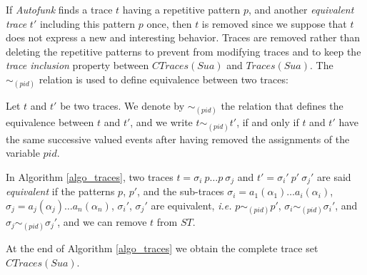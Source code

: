 If \emph{Autofunk} finds a trace $t$ having a repetitive pattern
$p$, and another \emph{equivalent trace} $t'$ including this
pattern $p$ once, then $t$ is removed since we suppose that $t$
does not express a new and interesting behavior. Traces are
removed rather than deleting the repetitive patterns to prevent
from modifying traces and to keep the \emph{trace inclusion}
\cite{petrenko06} property between $CTraces(Sua)$ and
$Traces(Sua)$. The $\sim_{(pid)}$ relation is used to define
equivalence between two traces:

\begin{definition}
    Let $t$ and $t'$ be two traces. We denote by $\sim_{(pid)}$
    the relation that defines the equivalence between $t$ and
    $t'$, and we write $t \sim_{(pid)} t'$, if and only if
    $t$ and $t'$ have the same successive valued events after
    having removed the assignments of the variable $pid$.
\end{definition}

In Algorithm \ref{algo_traces}, two traces $t=\sigma_i ~p \dots
p~ \sigma_j$ and $t'=\sigma_i' ~p'~ \sigma_j'$ are said
\emph{equivalent} if the patterns $p$, $p'$, and the sub-traces
$\sigma_i = a_1(\alpha_1) \dots a_i(\alpha_i)$, $\sigma_j =
a_j(\alpha_j) \dots a_n(\alpha_n)$, $\sigma_i'$, $\sigma_j'$ are
equivalent, \emph{i.e.} $p \sim_{(pid)} p'$, $\sigma_i
\sim_{(pid)} \sigma_i'$, and $\sigma_j \sim_{(pid)} \sigma_j'$,
and we can remove $t$ from $ST$.

At the end of Algorithm \ref{algo_traces} we obtain the complete
trace set $CTraces(Sua)$.

